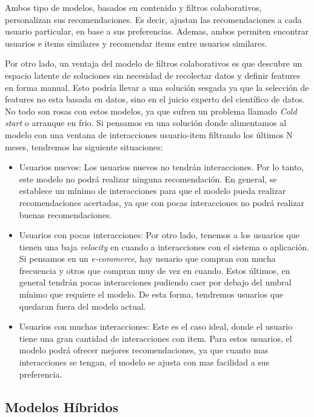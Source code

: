 \documentclass[11pt,a4paper,twoside]{thesis}
\begin{document}
Ambos tipo de modelos, basados en contenido y filtros colaborativos, personalizan sus recomendaciones. 
Es decir, ajustan las recomendaciones a cada usuario particular, en base a sus preferencias. Ademas, ambos permiten encontrar usuarios e items similares y recomendar items entre usuarios similares.

Por otro lado, un ventaja del modelo de filtros colaborativos es que descubre un espacio latente de soluciones sin necesidad de recolectar datos y definir features en forma manual. Esto podría llevar a una solución sesgada ya que la selección de features no esta basada en datos, sino en el juicio experto del científico de datos. 
No todo son rosas con estos modelos, ya que sufren un problema llamado \textit{Cold start} o arranque en frio. Si pensamos en una solución donde alimentamos al modelo con una ventana de interacciones usuario-item filtrando los últimos N meses, tendremos las siguiente situaciones:

\begin{itemize}
	\item Usuarios nuevos: Los usuarios nuevos no tendrán interacciones. Por lo tanto, este modelo no podrá realizar ninguna recomendación. En general, se establece un mínimo de interacciones para que el modelo pueda realizar recomendaciones acertadas, ya que con pocas interacciones no podrá realizar buenas recomendaciones.
	\item Usuarios con pocas interacciones: Por otro lado, tenemos a los usuarios que tienen una baja \textit{velocity} en cuando a interacciones con el sistema o aplicación. Si pensamos en un \textit{e-commerce}, hay usuario que compran con mucha frecuencia y otros que compran muy de vez en cuando. Estos últimos, en general tendrán pocas interacciones pudiendo caer por debajo del umbral mínimo que requiere el modelo. De esta forma, tendremos usuarios que quedaran fuera del modelo actual.
	\item Usuarios con muchas interacciones: Este es el caso ideal, donde el usuario tiene una gran cantidad de interacciones con item. Para estos usuarios, el modelo podrá ofrecer mejores recomendaciones, ya que cuanto mas interacciones se tengan, el modelo se ajusta con mas facilidad a sus preferencia.


\end{itemize}

\clearpage
\subsection{Modelos Híbridos}
\end{document}
